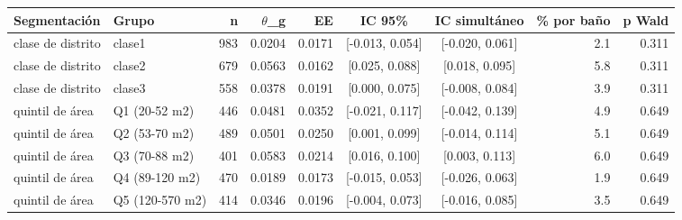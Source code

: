 \begin{tabular}{llrrrccrr}
\toprule
Segmentación & Grupo & n & $\theta$\_g & EE & IC 95\% & IC simultáneo & \% por baño & p Wald \\
\midrule
clase de distrito & clase1 & 983 & 0.0204 & 0.0171 & [-0.013, 0.054] & [-0.020, 0.061] & 2.1 & 0.311 \\
clase de distrito & clase2 & 679 & 0.0563 & 0.0162 & [0.025, 0.088] & [0.018, 0.095] & 5.8 & 0.311 \\
clase de distrito & clase3 & 558 & 0.0378 & 0.0191 & [0.000, 0.075] & [-0.008, 0.084] & 3.9 & 0.311 \\
quintil de área & Q1 (20-52 m2) & 446 & 0.0481 & 0.0352 & [-0.021, 0.117] & [-0.042, 0.139] & 4.9 & 0.649 \\
quintil de área & Q2 (53-70 m2) & 489 & 0.0501 & 0.0250 & [0.001, 0.099] & [-0.014, 0.114] & 5.1 & 0.649 \\
quintil de área & Q3 (70-88 m2) & 401 & 0.0583 & 0.0214 & [0.016, 0.100] & [0.003, 0.113] & 6.0 & 0.649 \\
quintil de área & Q4 (89-120 m2) & 470 & 0.0189 & 0.0173 & [-0.015, 0.053] & [-0.026, 0.063] & 1.9 & 0.649 \\
quintil de área & Q5 (120-570 m2) & 414 & 0.0346 & 0.0196 & [-0.004, 0.073] & [-0.016, 0.085] & 3.5 & 0.649 \\
\bottomrule
\end{tabular}